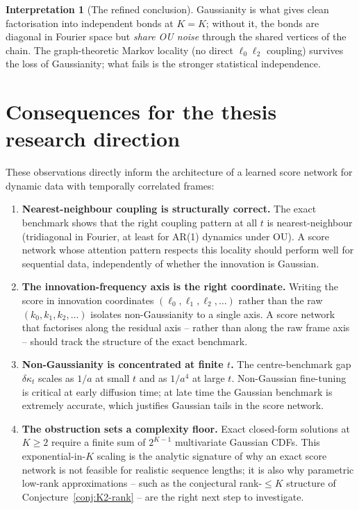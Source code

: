 \documentclass[11pt,a4paper,openany]{book}
\theoremstyle{plainserif}
\theoremstyle{definition}
\theoremstyle{remarkstyle}
\newtheorem*{interpretation}{Interpretation}
\begin{document}
\begin{interpretation}[The refined conclusion]
Gaussianity is what gives clean factorisation into independent bonds at
$K=K$; without it, the bonds are diagonal in Fourier space but
\emph{share OU noise} through the shared vertices of the chain. The
graph-theoretic Markov locality (no direct $\ell_0\ell_2$ coupling)
survives the loss of Gaussianity; what fails is the stronger statistical
independence.
\end{interpretation}

\section{Consequences for the thesis research direction}

These observations directly inform the architecture of a learned score
network for dynamic data with temporally correlated frames:

\begin{enumerate}[leftmargin=2em]
\item \textbf{Nearest-neighbour coupling is structurally correct.}
The exact benchmark shows that the right coupling pattern at all $t$ is
nearest-neighbour (tridiagonal in Fourier, at least for AR(1) dynamics
under OU). A score network whose attention pattern respects this
locality should perform well for sequential data, independently of
whether the innovation is Gaussian.

\item \textbf{The innovation-frequency axis is the right coordinate.}
Writing the score in innovation coordinates $(\ell_0, \ell_1, \ell_2, \ldots)$
rather than the raw $(k_0, k_1, k_2, \ldots)$ isolates non-Gaussianity
to a single axis. A score network that factorises along the residual
axis -- rather than along the raw frame axis -- should track the
structure of the exact benchmark.

\item \textbf{Non-Gaussianity is concentrated at finite $t$.}
The centre-benchmark gap $\delta\kappa_t$ scales as $1/a$ at small $t$
and as $1/a^4$ at large $t$. Non-Gaussian fine-tuning is critical at
early diffusion time; at late time the Gaussian benchmark is extremely
accurate, which justifies Gaussian tails in the score network.

\item \textbf{The obstruction sets a complexity floor.}
Exact closed-form solutions at $K \geq 2$ require a finite sum of $2^{K-1}$
multivariate Gaussian CDFs. This exponential-in-$K$ scaling is the
analytic signature of why an exact score network is not feasible for
realistic sequence lengths; it is also why parametric low-rank
approximations -- such as the conjectural rank-$\leq K$ structure of
Conjecture~\ref{conj:K2-rank} -- are the right next step to investigate.
\end{enumerate}
\end{document}
